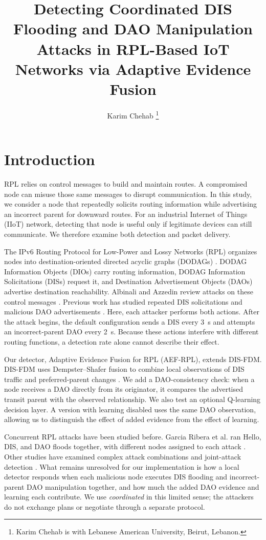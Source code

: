 \documentclass[journal]{IEEEtran}
\title{Detecting Coordinated DIS Flooding and DAO Manipulation Attacks in RPL-Based IoT Networks via Adaptive Evidence Fusion}
\author{Karim Chehab%
\thanks{Karim Chehab is with Lebanese American University, Beirut, Lebanon.}}
\date{}
\begin{document}
\maketitle

\section{Introduction}\label{sec:introduction}
RPL relies on control messages to build and maintain routes. A compromised node can misuse those same messages to disrupt communication. In this study, we consider a node that repeatedly solicits routing information while advertising an incorrect parent for downward routes. For an industrial Internet of Things (IIoT) network, detecting that node is useful only if legitimate devices can still communicate. We therefore examine both detection and packet delivery.

The IPv6 Routing Protocol for Low-Power and Lossy Networks (RPL) organizes nodes into destination-oriented directed acyclic graphs (DODAGs) \cite{rfc6550}. DODAG Information Objects (DIOs) carry routing information, DODAG Information Solicitations (DISs) request it, and Destination Advertisement Objects (DAOs) advertise destination reachability. Albinali and Azzedin review attacks on these control messages \cite{albinali2024}. Previous work has studied repeated DIS solicitations \cite{rajasekar2022,vermaranga2020,medjek2021} and malicious DAO advertisements \cite{pu2018,limsd2024}. Here, each attacker performs both actions. After the attack begins, the default configuration sends a DIS every 3~s and attempts an incorrect-parent DAO every 2~s. Because these actions interfere with different routing functions, a detection rate alone cannot describe their effect.

Our detector, Adaptive Evidence Fusion for RPL (AEF-RPL), extends DIS-FDM. DIS-FDM uses Dempster--Shafer fusion to combine local observations of DIS traffic and preferred-parent changes \cite{prajisha2025}. We add a DAO-consistency check: when a node receives a DAO directly from its originator, it compares the advertised transit parent with the observed relationship. We also test an optional Q-learning decision layer. A version with learning disabled uses the same DAO observation, allowing us to distinguish the effect of added evidence from the effect of learning.

Concurrent RPL attacks have been studied before. Garcia Ribera et al. ran Hello, DIS, and DAO floods together, with different nodes assigned to each attack \cite{garciaribera2022}. Other studies have examined complex attack combinations and joint-attack detection \cite{alsukayti2023,de2rarpl2024,abdulkareem2024}. What remains unresolved for our implementation is how a local detector responds when each malicious node executes DIS flooding and incorrect-parent DAO manipulation together, and how much the added DAO evidence and learning each contribute. We use \emph{coordinated} in this limited sense; the attackers do not exchange plans or negotiate through a separate protocol.
\end{document}
